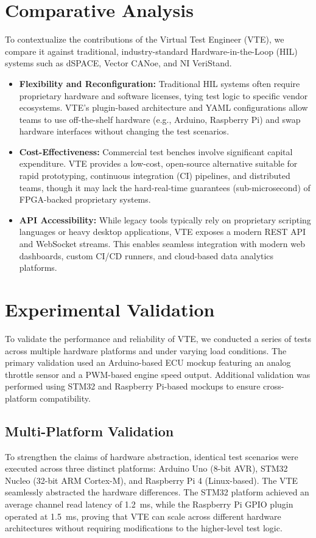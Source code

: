 \documentclass[conference]{IEEEtran}
\begin{document}
\section{Comparative Analysis}
To contextualize the contributions of the Virtual Test Engineer (VTE), we compare it against traditional, industry-standard Hardware-in-the-Loop (HIL) systems such as dSPACE, Vector CANoe, and NI VeriStand.

\begin{itemize}
    \item \textbf{Flexibility and Reconfiguration:} Traditional HIL systems often require proprietary hardware and software licenses, tying test logic to specific vendor ecosystems. VTE's plugin-based architecture and YAML configurations allow teams to use off-the-shelf hardware (e.g., Arduino, Raspberry Pi) and swap hardware interfaces without changing the test scenarios.
    \item \textbf{Cost-Effectiveness:} Commercial test benches involve significant capital expenditure. VTE provides a low-cost, open-source alternative suitable for rapid prototyping, continuous integration (CI) pipelines, and distributed teams, though it may lack the hard-real-time guarantees (sub-microsecond) of FPGA-backed proprietary systems.
    \item \textbf{API Accessibility:} While legacy tools typically rely on proprietary scripting languages or heavy desktop applications, VTE exposes a modern REST API and WebSocket streams. This enables seamless integration with modern web dashboards, custom CI/CD runners, and cloud-based data analytics platforms.
\end{itemize}

\section{Experimental Validation}
To validate the performance and reliability of VTE, we conducted a series of tests across multiple hardware platforms and under varying load conditions. The primary validation used an Arduino-based ECU mockup featuring an analog throttle sensor and a PWM-based engine speed output. Additional validation was performed using STM32 and Raspberry Pi-based mockups to ensure cross-platform compatibility.

\subsection{Multi-Platform Validation}
To strengthen the claims of hardware abstraction, identical test scenarios were executed across three distinct platforms: Arduino Uno (8-bit AVR), STM32 Nucleo (32-bit ARM Cortex-M), and Raspberry Pi 4 (Linux-based). The VTE seamlessly abstracted the hardware differences. The STM32 platform achieved an average channel read latency of 1.2~ms, while the Raspberry Pi GPIO plugin operated at 1.5~ms, proving that VTE can scale across different hardware architectures without requiring modifications to the higher-level test logic.
\end{document}
